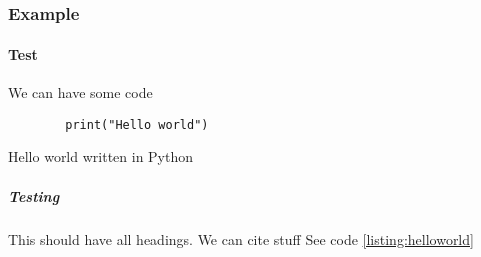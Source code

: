 \documentclass{uniarticle}
\begin{document}
\begin{figure}[h]
    \caption{}
    \label{fig:}
\end{figure}

\subsection{}
\subsubsection{Example}

\paragraph{Test}

We can have some code

\begin{listing}
    \begin{verbatim}
        print("Hello world")
    \end{verbatim}
    \caption{Hello world written in Python}
    \label{listing:helloworld}
\end{listing}

\subparagraph{Testing}

This should have all headings. We can cite stuff \cite{example-citekey}
See code \cref{listing:helloworld}
\end{document}
